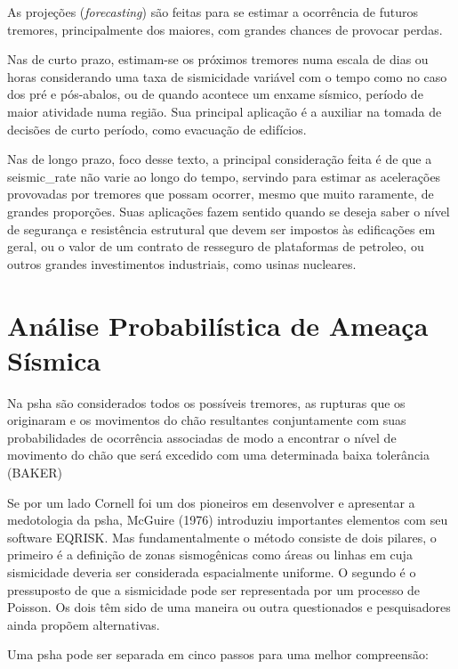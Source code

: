 As projeções (\textit{forecasting}) são feitas para se estimar a ocorrência de futuros tremores,
principalmente dos maiores, com grandes chances de provocar perdas.

Nas de curto prazo, estimam-se os próximos tremores
numa escala de dias ou horas considerando uma taxa de sismicidade variável 
com o tempo como no caso dos pré e pós-abalos, ou de quando 
acontece um enxame sísmico, período de maior atividade numa região.
Sua principal aplicação é a auxiliar na tomada de decisões de curto período, 
como evacuação de edifícios.

Nas de longo prazo, foco desse texto, a principal consideração feita é de que a 
\gls{seismic_rate} não varie ao longo do tempo, servindo para estimar as acelerações 
provovadas por tremores que possam ocorrer,
mesmo que muito raramente, de grandes proporções. Suas aplicações fazem sentido quando
se deseja saber o nível de segurança e resistência estrutural que devem ser impostos 
às edificações em geral, ou o valor de um contrato de resseguro de plataformas de petroleo,
ou outros grandes investimentos industriais, como usinas nucleares.


\section{Análise Probabilística de Ameaça Sísmica}
\label{sec:psha}

Na \gls{psha} são considerados todos os possíveis tremores, as rupturas que os originaram e os movimentos do chão
resultantes conjuntamente com suas probabilidades de ocorrência associadas de modo a encontrar o nível de movimento do
chão que será excedido com uma determinada baixa tolerância (BAKER)

Se por um lado Cornell foi um dos pioneiros em desenvolver e apresentar a medotologia da \gls{psha}, McGuire (1976)
introduziu importantes elementos com seu software EQRISK. Mas fundamentalmente o método consiste de dois pilares, o
primeiro é a definição de zonas sismogênicas como áreas ou linhas em cuja sismicidade deveria ser considerada
espacialmente uniforme. O segundo é o pressuposto de que a sismicidade pode ser representada por um processo de Poisson.
Os dois têm sido de uma maneira ou outra questionados e pesquisadores ainda propõem alternativas.

Uma \gls{psha} pode ser separada em cinco passos para uma melhor compreensão:

